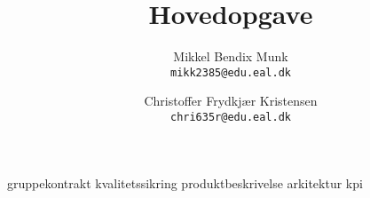\documentclass[a4paper, 11pt, danish]{report}
\title{Hovedopgave}
\author{
    Mikkel Bendix Munk\\
    \texttt{mikk2385@edu.eal.dk}
    \and
    Christoffer Frydkjær Kristensen\\
    \texttt{chri635r@edu.eal.dk}
}
\begin{document}
\maketitle
\tableofcontents{}
\newpage
%
%
%
{gruppekontrakt}
{kvalitetssikring}
{produktbeskrivelse}
{arkitektur}
{kpi}
%
%
\end{document}
